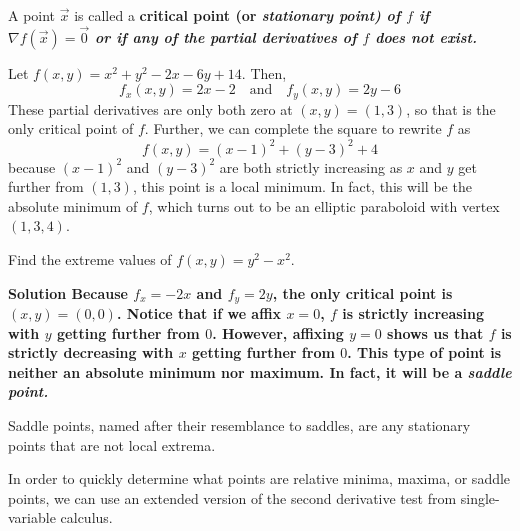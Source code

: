 A point \(\vec x\) is called a \bf{critical point} (or \it{stationary point}) of \(f\) if \(\nabla f(\vec x) = \vec 0\) or if any of the partial derivatives of \(f\) does not exist.
\begin{example}
    Let \(f(x,y)=x^2+y^2-2x-6y+14\). Then,
    \[ f_x(x,y) = 2x-2\quad\text{and}\quad f_y(x,y) = 2y-6\]
    These partial derivatives are only both zero at \((x,y) = (1, 3)\), so that is the only critical point of \(f\). Further, we can complete the square to rewrite \(f\) as 
    \[ f(x,y) = (x-1)^2 + (y-3)^2+4 \]
    because \((x-1)^2\) and \((y-3)^2\) are both strictly increasing as \(x\) and \(y\) get further from \((1, 3)\), this point is a local minimum. In fact, this will be the absolute minimum of \(f\), which turns out to be an elliptic paraboloid with vertex \((1, 3, 4)\).
\end{example}
\begin{example}
    Find the extreme values of \(f(x,y) = y^2-x^2\).\par\bf{Solution}
    Because \(f_x = -2x\) and \(f_y = 2y\), the only critical point is \((x,y)=(0,0)\). Notice that if we affix \(x=0\), \(f\) is strictly increasing with \(y\) getting further from \(0\). However, affixing \(y=0\) shows us that \(f\) is strictly decreasing with \(x\) getting further from \(0\). This type of point is neither an absolute minimum nor maximum. In fact, it will be a \it{saddle point}. 
\end{example}
Saddle points, named after their resemblance to saddles, are any stationary points that are not local extrema.\par
In order to quickly determine what points are relative minima, maxima, or saddle points, we can use an extended version of the second derivative test from single-variable calculus.
